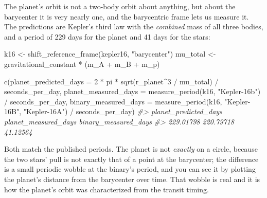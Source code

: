 \documentclass[
  10.5pt,
  letterpaper,
]{scrbook}
\newenvironment{Shaded}{\begin{snugshade}}{\end{snugshade}}
\newcommand{\AttributeTok}[1]{\textcolor[rgb]{0.00,0.00,0.00}{#1}}
\newcommand{\CommentTok}[1]{\textcolor[rgb]{0.00,0.00,0.00}{\textit{#1}}}
\newcommand{\DecValTok}[1]{\textcolor[rgb]{0.00,0.00,0.00}{#1}}
\newcommand{\FunctionTok}[1]{\textcolor[rgb]{0.00,0.00,0.00}{#1}}
\newcommand{\NormalTok}[1]{\textcolor[rgb]{0.00,0.00,0.00}{#1}}
\newcommand{\OtherTok}[1]{\textcolor[rgb]{0.00,0.00,0.00}{#1}}
\newcommand{\SpecialCharTok}[1]{\textcolor[rgb]{0.00,0.00,0.00}{#1}}
\newcommand{\StringTok}[1]{\textcolor[rgb]{0.00,0.00,0.00}{#1}}
\theoremstyle{plain}
\theoremstyle{remark}
\begin{document}
The planet's orbit is not a two-body orbit about anything, but about the
barycenter it is very nearly one, and the barycentric frame lets us
measure it. The predictions are Kepler's third law with the
\emph{combined} mass of all three bodies, and a period of 229 days for
the planet and 41 days for the stars:

\begin{Shaded}
\begin{Highlighting}[]
\NormalTok{k16 }\OtherTok{\textless{}{-}} \FunctionTok{shift\_reference\_frame}\NormalTok{(kepler16, }\StringTok{"barycenter"}\NormalTok{)}
\NormalTok{mu\_total }\OtherTok{\textless{}{-}}\NormalTok{ gravitational\_constant }\SpecialCharTok{*}\NormalTok{ (m\_A }\SpecialCharTok{+}\NormalTok{ m\_B }\SpecialCharTok{+}\NormalTok{ m\_p)}

\FunctionTok{c}\NormalTok{(}\AttributeTok{planet\_predicted\_days =} \DecValTok{2} \SpecialCharTok{*}\NormalTok{ pi }\SpecialCharTok{*} \FunctionTok{sqrt}\NormalTok{(r\_planet}\SpecialCharTok{\^{}}\DecValTok{3} \SpecialCharTok{/}\NormalTok{ mu\_total) }\SpecialCharTok{/}\NormalTok{ seconds\_per\_day,}
  \AttributeTok{planet\_measured\_days  =} \FunctionTok{measure\_period}\NormalTok{(k16, }\StringTok{"Kepler{-}16b"}\NormalTok{) }\SpecialCharTok{/}\NormalTok{ seconds\_per\_day,}
  \AttributeTok{binary\_measured\_days  =} \FunctionTok{measure\_period}\NormalTok{(k16, }\StringTok{"Kepler{-}16B"}\NormalTok{, }\StringTok{"Kepler{-}16A"}\NormalTok{) }\SpecialCharTok{/}
\NormalTok{                          seconds\_per\_day)}
\CommentTok{\#\textgreater{} planet\_predicted\_days  planet\_measured\_days  binary\_measured\_days }
\CommentTok{\#\textgreater{}             229.01798             220.79718              41.12564}
\end{Highlighting}
\end{Shaded}

Both match the published periods. The planet is not \emph{exactly} on a
circle, because the two stars' pull is not exactly that of a point at
the barycenter; the difference is a small periodic wobble at the
binary's period, and you can see it by plotting the planet's distance
from the barycenter over time. That wobble is real and it is how the
planet's orbit was characterized from the transit timing.
\end{document}
